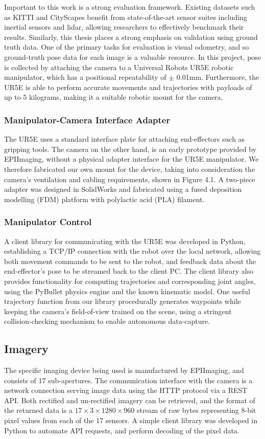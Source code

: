 Important to this work is a strong evaluation framework. Existing datasets such as KITTI and CityScapes benefit from state-of-the-art sensor suites including inertial sensors and lidar, allowing researchers to effectively benchmark their results. Similarly, this thesis places a strong emphasis on validation using ground truth data. One of the primary tasks for evaluation is visual odometry, and so ground-truth pose data for each image is a valuable resource. In this project, pose is collected by attaching the camera to a Universal Robots UR5E robotic manipulator, which has a positional repeatability of $\pm$ 0.01mm. Furthermore, the UR5E is able to perform accurate movements and trajectories with payloads of up to 5 kilograms, making it a suitable robotic mount for the camera. 

\subsubsection{Manipulator-Camera Interface Adapter}
The UR5E uses a standard interface plate for attaching end-effectors such as gripping tools. The camera on the other hand, is an early prototype provided by EPIImaging, without a physical adapter interface for the UR5E manipulator. We therefore fabricated our own mount for the device, taking into consideration the camera's ventilation and cabling requirements, shown in Figure 4.1. A two-piece adapter was designed in SolidWorks and fabricated using a fused deposition modelling (FDM) platform with polylactic acid (PLA) filament. 

\subsubsection{Manipulator Control}
A client library for communicating with the UR5E was developed in Python, establishing a TCP/IP connection with the robot over the local network, allowing both movement commands to be sent to the robot, and feedback data about the end-effector's pose to be streamed back to the client PC. The client library also provides functionality for computing trajectories and corresponding joint angles, using the PyBullet \cite{pybullet2017} physics engine and the known kinematic model. One useful trajectory function from our library procedurally generates waypoints while keeping the camera's field-of-view trained on the scene, using a stringent collision-checking mechanism to enable autonomous data-capture. 

\subsection{Imagery}
The specific imaging device being used is manufactured by EPIImaging, and consists of 17 sub-apertures. The communication interface with the camera is a network connection serving image data using the HTTP protocol via a REST API. Both rectified and un-rectified imagery can be retrieved, and the format of the returned data is a $17\times 3 \times 1280 \times 960$ stream of raw bytes representing 8-bit pixel values from each of the 17 sensors. A simple client library was developed in Python to automate API requests, and perform decoding of the pixel data.

